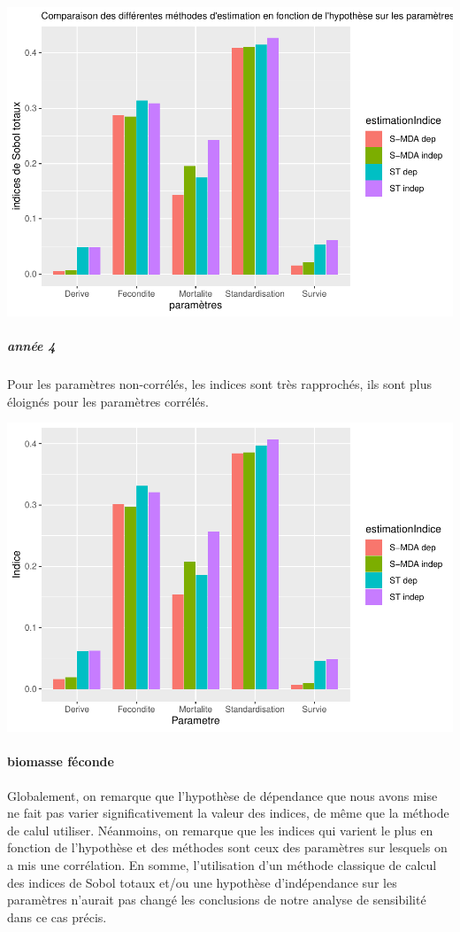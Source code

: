 \documentclass[
]{article}
\begin{document}
\includegraphics{rapport_files/figure-latex/prtygessf-1.pdf}

\hypertarget{annuxe9e-4}{%
\subparagraph{année 4}\label{annuxe9e-4}}

Pour les paramètres non-corrélés, les indices sont très rapprochés, ils
sont plus éloignés pour les paramètres corrélés.

\includegraphics{rapport_files/figure-latex/vhe-1.pdf}

\hypertarget{biomasse-fuxe9conde-2}{%
\paragraph{biomasse féconde}\label{biomasse-fuxe9conde-2}}

Globalement, on remarque que l'hypothèse de dépendance que nous avons
mise ne fait pas varier significativement la valeur des indices, de même
que la méthode de calul utiliser. Néanmoins, on remarque que les indices
qui varient le plus en fonction de l'hypothèse et des méthodes sont ceux
des paramètres sur lesquels on a mis une corrélation. En somme,
l'utilisation d'un méthode classique de calcul des indices de Sobol
totaux et/ou une hypothèse d'indépendance sur les paramètres n'aurait
pas changé les conclusions de notre analyse de sensibilité dans ce cas
précis.
\end{document}
